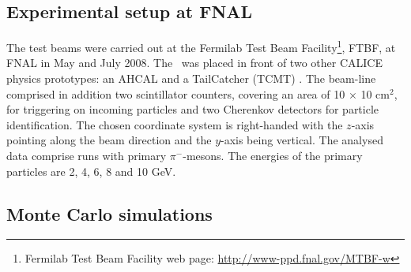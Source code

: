 \subsection{Experimental setup at FNAL}\label{sec:fnal}
The test beams were carried out at the Fermilab Test Beam Facility\footnote{\label{note1}Fermilab Test Beam Facility web page: \url{http://www-ppd.fnal.gov/MTBF-w}}, FTBF, at FNAL in May and July 2008.
The \ecal\ was placed in front of two other CALICE physics prototypes: an AHCAL \cite{collaboration:2010hb} and a TailCatcher (TCMT) \cite{CALICE:2012aa}.
The beam-line comprised in addition two scintillator counters, covering an area of 10 $\times$ 10 cm$^2$, for triggering on incoming particles and two Cherenkov detectors for particle identification.
The chosen coordinate system is right-handed with the $z$-axis pointing along the beam direction and the $y$-axis being vertical.
The analysed data comprise runs with primary $\pi^-$-mesons. The energies of the primary particles are 2, 4, 6, 8 and 10 GeV.

\subsection{Monte Carlo simulations}

